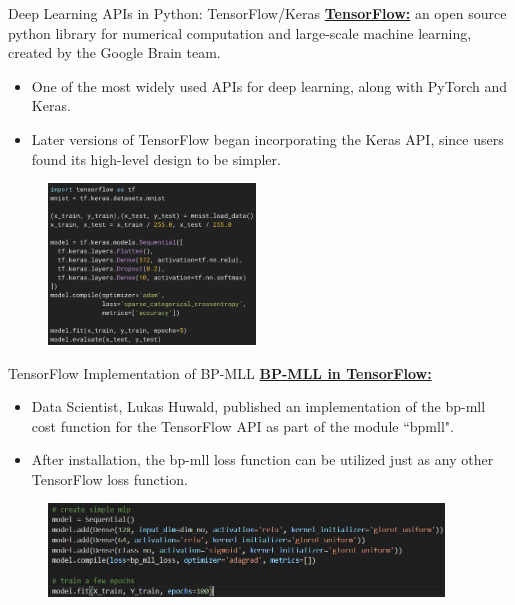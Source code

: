 \documentclass{beamer}
\begin{document}
\begin{frame}[t]{Deep Learning APIs in Python: TensorFlow/Keras}
    \textbf{\underline{TensorFlow:}} an open source python library for numerical computation and large-scale machine learning, created by the Google Brain team.
    \begin{itemize}
        \item[\rightarrow] 
        One of the most widely used APIs for deep learning, along with PyTorch and Keras.
        
        \item[\rightarrow]
        Later versions of TensorFlow began incorporating the Keras API, since users found its high-level design to be simpler.
    \end{itemize}
    
    \begin{figure}[htp]
        \centering
        \includegraphics[width = 5.5cm]{basic_tensorflow_keras_code.png}
    \end{figure}
\end{frame}

\begin{frame}[t]{TensorFlow Implementation of BP-MLL}
    \textbf{\underline{BP-MLL in TensorFlow:}}
    \begin{itemize}
        \item[\rightarrow]
        Data Scientist, Lukas Huwald, published an implementation of the bp-mll cost function for the TensorFlow API as part of the module ``bpmll".
        
        \item[\rightarrow]
        After installation, the bp-mll loss function can be utilized just as any other TensorFlow loss function.
    \end{itemize}
    
    \begin{figure}[htp]
        \centering
        \includegraphics[width = 10.5cm]{bpmll_example_code.PNG}
    \end{figure}
\end{frame}
\end{document}
